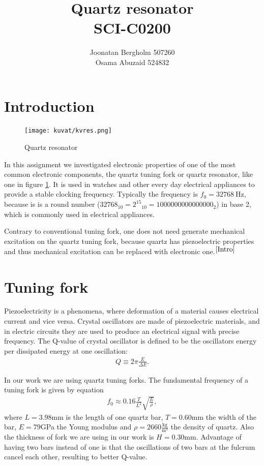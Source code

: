 \documentclass[12pt]{article}
\title{\textbf{Quartz resonator} \\ SCI-C0200}
\author{Joonatan Bergholm 507260 \\ Osama Abuzaid 524832}
\begin{document}
\maketitle
\newpage


\tableofcontents
\newpage

\section{Introduction}

\begin{figure}
	\centering
	\texttt{[image: kuvat/kvres.png]}
	\caption{Quartz resonator}
	\label{fig:kvres}
\end{figure}

In this assignment we investigated electronic properties of one of the most common electronic components, the quartz tuning fork or quartz resonator, like one in figure \ref{fig:kvres}. It is used in watches and other every day electrical appliances to provide a stable clocking frequency. Typically the frequency is $f_0 = \SI{32768}{\hertz}$, because is is a round number ($32768_{10} = {2^{15}}_{10} = 1000000000000000_2$) in base 2, which is commonly used in electrical appliances.

Contrary to conventional tuning fork, one does not need generate mechanical excitation
on the quartz tuning fork, because quartz has piezoelectric properties and thus mechanical excitation can be replaced with electronic one.$^{\cite{Intro}}$

\section{Tuning fork}
Piezoelectricity is a phenomena, where deformation of a material causes electrical current and vice versa. Crystal oscillators are made of piezoelectric materials, and in electric circuits they are used to produce an electrical signal with precise frequency. The Q-value of crystal oscillator is defined to be the oscillators energy per dissipated energy at one oscillation:
\begin{align}
Q \equiv 2\pi\frac{E}{\Delta E}.
\end{align}

In our work we are using quartz tuning forks. The fundamental frequency of a tuning fork is given by equation
\begin{align}
f_0 \approx 0.16\frac{T}{L^2}\sqrt{\frac{E}{\rho}},
\end{align}
where $L = 3.98 $mm is the length of one quartz bar, $T = 0.60 $mm the width of the bar, $E = 79 $GPa the Young modulus and $\rho = 2660\frac{\mathrm{kg}}{\mathrm{m}^3}$ the density of quartz. Also the thickness of fork we are using in our work is $H = 0.30$mm. Advantage of having two bars instead of one is that the oscillations of two bars at the fulcrum cancel each other, resulting to better Q-value.
\end{document}
